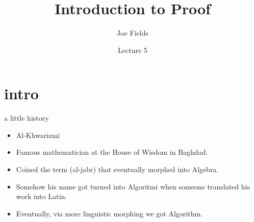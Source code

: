 \documentclass[landscape]{beamer}
\author{Joe Fields}
\title{Introduction to Proof}
\date{Lecture 5}
\institute[SCSU]{ {\tt fieldsj1@southernct.edu} }
\begin{document}
\begin{frame}[plain]
  \titlepage
\end{frame}

\section{intro}

{ %
\begin{frame}[plain]
\rule{0pt}{0pt}
\end{frame} 
} %

\begin{frame}{a little history}
\begin{itemize}
\item Al-Khwarizmi\pause
\item Famous mathematician at the House of Wisdom in Baghdad. \pause
\item Coined the term (al-jabr) that eventually morphed into Algebra.\pause
\item Somehow his name got turned into Algoritmi when someone translated his work into Latin. \pause
\item Eventually, via more linguistic morphing we got Algorithm.
\end{itemize}
\end{frame}
\end{document}
